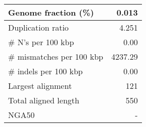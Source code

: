 \documentclass[12pt,a4paper]{article}
\begin{document}
\begin{table}[ht]
\begin{center}
\begin{tabular}{|l*{1}{|r}|}
Genome fraction (\%) & 0.013 \\ \hline
Duplication ratio & 4.251 \\ \hline
\# N's per 100 kbp & 0.00 \\ \hline
\# mismatches per 100 kbp & 4237.29 \\ \hline
\# indels per 100 kbp & 0.00 \\ \hline
Largest alignment & 121 \\ \hline
Total aligned length & 550 \\ \hline
NGA50 & - \\ \hline
\end{tabular}
\end{center}
\end{table}
\end{document}
